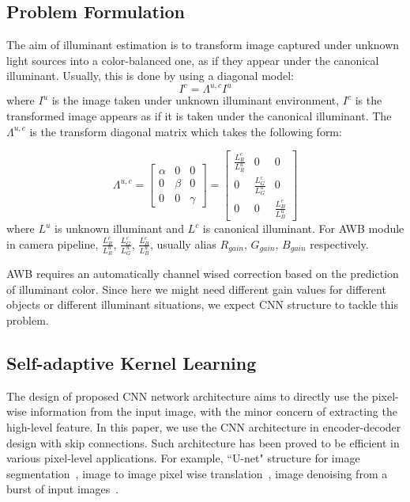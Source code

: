 \documentclass[10pt,twocolumn,letterpaper]{article}
\begin{document}
\subsection{Problem Formulation}
The aim of illuminant estimation is to transform image captured under unknown light sources
into a color-balanced one, as if they appear under the canonical illuminant.
Usually, this is done by using a diagonal model:
\begin{equation}
I^c = \Lambda^{u,c}I^{u}
\label{eq:illu}
\end{equation}
where $I^{u}$ is the image taken under unknown illuminant environment,
$I^{c}$ is the transformed image appears as if it is taken under the canonical illuminant.
The $\Lambda^{u,c}$ is the transform diagonal matrix which takes the following form:

\begin{equation}
\Lambda^{u,c} =
\left[
\begin{array}{ccc}
\alpha & 0 & 0\\
0 & \beta & 0\\
0 & 0 &\gamma
\end{array}
\right]
=
\left[
\begin{array}{ccc}
\frac{L_R^c}{L_R^{u}} & 0 & 0\\
0& \frac{L_G^c}{L_G^{u}} & 0\\
0 & 0 & \frac{L_B^c}{L_B^{u}}
\end{array}
\right]
\end{equation}
where $L^u$ is unknown illuminant and $L^{c}$ is canonical illuminant.
For AWB module in camera pipeline, $\frac{L_R^c}{L_R^{u}}$, $\frac{L_G^c}{L_G^{u}}$, $\frac{L_B^c}{L_B^{u}}$,
usually alias $R_{gain}$, $G_{gain}$, $B_{gain}$ respectively.

AWB requires an automatically channel wised correction based on the prediction of illuminant color.
Since here we might need different gain values for different objects or different illuminant situations,
we expect CNN structure to tackle this problem.

\subsection{Self-adaptive Kernel Learning}
The design of proposed CNN network architecture aims to directly use the pixel-wise information from the input image,
with the minor concern of extracting the high-level feature.
In this paper, we use the CNN architecture in encoder-decoder design with skip connections.
Such architecture has been proved to be efficient in various pixel-level applications.
For example,
``U-net" structure for image segmentation~\cite{DBLP:journals/corr/RonnebergerFB15},
image to image pixel wise translation~\cite{isola2017image},
image denoising from a burst of input images~\cite{DBLP:journals/corr/abs-1712-02327}.
\end{document}
